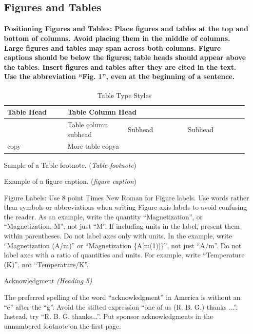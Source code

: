 \documentclass[preprint,12pt,authoryear]{elsarticle}
\begin{document}
\subsection{Figures and Tables}

\paragraph{ Positioning Figures and Tables: Place figures and tables at the top and bottom of columns. Avoid placing them in the middle of columns. Large figures and tables may span across both columns. Figure captions should be below the figures; table heads should appear above the tables. Insert figures and tables after they are cited in the text. Use the abbreviation “Fig. 1”, even at the beginning of a sentence.}

\begin{table}[H]
  \centering
  \begin{tabular}{|p{0.245\linewidth}|p{0.245\linewidth}|p{0.245\linewidth}|p{0.245\linewidth}|}
  \hline
    \multirow{2}{*}{Table Head} & \multicolumn{3}{p{0.735\linewidth}}{Table Column Head} \\
  \hline
     & Table column subhead & Subhead & Subhead \\
  \hline
    copy & More table copya &  &  \\
  \hline
  \end{tabular}
  \caption{Table Type Styles}
  \label{tab:bang1}
\end{table}

Sample of a Table footnote. (\textit{Table footnote})

Example of a figure caption. (\textit{figure caption})

Figure Labels: Use 8 point Times New Roman for Figure labels. Use words rather than symbols or abbreviations when writing Figure axis labels to avoid confusing the reader. As an example, write the quantity “Magnetization”, or “Magnetization, M”, not just “M”. If including units in the label, present them within parentheses. Do not label axes only with units. In the example, write “Magnetization (A/m)” or “Magnetization \{A[m(1)]\}”, not just “A/m”. Do not label axes with a ratio of quantities and units. For example, write “Temperature (K)”, not “Temperature/K”.

Acknowledgment \textit{(}\textit{Heading 5}\textit{)}

The preferred spelling of the word “acknowledgment” in America is without an “e” after the “g”. Avoid the stilted expression “one of us (R. B. G.) thanks ...”.  Instead, try “R. B. G. thanks...”. Put sponsor acknowledgments in the unnumbered footnote on the first page.
\end{document}
